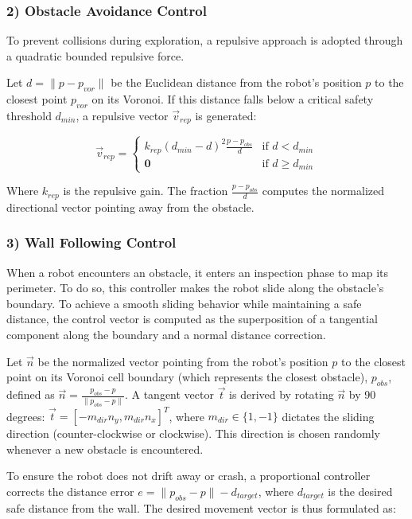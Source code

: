 \documentclass[times, twoside]{zHenriquesLab-StyleBioRxiv}
\begin{document}
\subsubsection*{2) Obstacle Avoidance Control}
To prevent collisions during exploration, a repulsive approach is adopted through a quadratic bounded repulsive force. 

Let $d = \|p - p_{vor}\|$ be the Euclidean distance from the robot's position $p$ to the closest point $p_{vor}$ on its Voronoi. If this distance falls below a critical safety threshold $d_{min}$, a repulsive vector $\vec{v}_{rep}$ is generated:

\begin{equation}
\vec{v}_{rep} = 
\begin{cases} 
k_{rep} (d_{min} - d)^2 \frac{p - p_{obs}}{d} & \text{if } d < d_{min} \\ 
\mathbf{0} & \text{if } d \geq d_{min} 
\end{cases}
\label{eq:repuls_vect}
\end{equation}

Where $k_{rep}$ is the repulsive gain. The fraction $\frac{p - p_{obs}}{d}$ computes the normalized directional vector pointing away from the obstacle. 


\subsubsection*{3) Wall Following Control}
When a robot encounters an obstacle, it enters an inspection phase to map its perimeter. To do so, this controller makes the robot slide along the obstacle's boundary. To achieve a smooth sliding behavior while maintaining a safe distance, the control vector is computed as the superposition of a tangential component along the boundary and a normal distance correction.

Let $\vec{n}$ be the normalized vector pointing from the robot's position $p$ to the closest point on its Voronoi cell boundary (which represents the closest obstacle), $p_{obs}$, defined as $\vec{n} = \frac{p_{obs} - p}{\|p_{obs} - p\|}$. A tangent vector $\vec{t}$ is derived by rotating $\vec{n}$ by 90 degrees: $\vec{t} = [-m_{dir} n_y, m_{dir} n_x]^T$, where $m_{dir} \in \{1, -1\}$ dictates the sliding direction (counter-clockwise or clockwise). This direction is chosen randomly whenever a new obstacle is encountered. 

To ensure the robot does not drift away or crash, a proportional controller corrects the distance error $e = \|p_{obs} - p\| - d_{target}$, where $d_{target}$ is the desired safe distance from the wall. The desired movement vector is thus formulated as:
\end{document}
